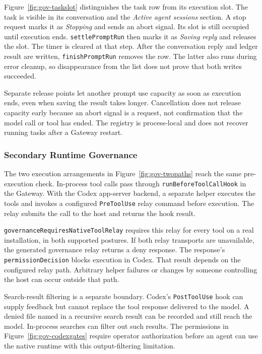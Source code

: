 {\color{red}Figure~\ref{fig:gov-taskslot} distinguishes the task row from its
execution slot. The task is visible in its conversation and the
\textit{Active agent sessions} section. A stop request marks it as
\textit{Stopping} and sends an abort signal. Its slot is still occupied until
execution ends. \texttt{settlePromptRun} then marks it as \textit{Saving reply}
and releases the slot. The timer is cleared at that step. After the conversation reply and
ledger result are written, \texttt{finishPromptRun} removes the row.
The latter also runs during error cleanup, so disappearance from the list
does not prove that both writes succeeded.

Separate release points let another prompt use capacity as soon as execution
ends, even when saving the result takes longer. Cancellation does not release
capacity early because an abort signal is a request, not confirmation that
the model call or tool has ended. The registry is process-local and does not
recover running tasks after a Gateway restart.}

\subsubsection{Secondary Runtime Governance}
\label{sec:gov-secondary-runtime}

{\color{red}The two execution arrangements in Figure~\ref{fig:gov-twopaths}
reach the same pre-execution check. In-process tool calls pass through
\texttt{runBeforeToolCallHook} in the Gateway. With the Codex app-server
backend, a separate helper executes the tools and invokes a configured
\texttt{PreToolUse} relay command before execution. The relay submits the
call to the host and returns the hook result.

\texttt{governanceRequiresNativeToolRelay} requires this relay for every tool
on a real installation, in both supported postures. If both relay transports
are unavailable, the generated governance relay returns a deny response.
The response's \texttt{permissionDecision} blocks execution in Codex.
That result depends on the configured relay path. Arbitrary helper failures
or changes by someone controlling the host can occur outside that path.

Search-result filtering is a separate boundary. Codex's
\texttt{PostToolUse} hook can supply feedback but cannot replace the tool
response delivered to the model. A denied file named in a recursive search
result can be recorded and still reach the model. In-process searches can
filter out such results. The permissions in Figure~\ref{fig:gov-codexgates}
require operator authorization before an agent can use the native runtime
with this output-filtering limitation.}

